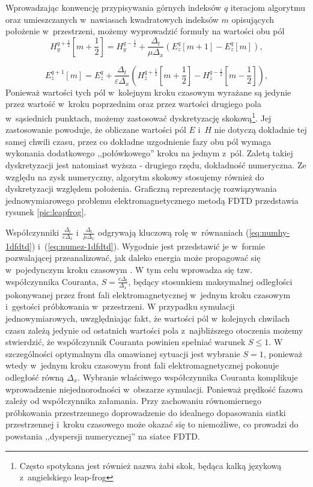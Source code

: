  Wprowadzając konwencję przypisywania górnych indeksów $q$  iteracjom algorytmu oraz umieszczanych w~nawiasach kwadratowych indeksów $m$ opisujących położenie w~przestrzeni, możemy wyprowadzić formuły na wartości obu pól
\begin{equation}
H_y^{q+\frac{1}{2}}[m+\frac{1}{2}]=H_y^{q-\frac{1}{2}}+\frac{\Delta_t}{\mu \Delta_x}(E^q_z[m+1]-E^q_z[m]),
\label{eq:numhy-1dfdtd}
\end{equation}

\begin{equation}
E_z^{q+1}[m]=E_z^{q}+\frac{\Delta_t}{\varepsilon \Delta_x}(H^{q+\frac{1}{2}}_z[m+\frac{1}{2}]-H^{q-\frac{1}{2}}_z[m-\frac{1}{2}]),
\label{eq:numez-1dfdtd}
\end{equation}
 Ponieważ wartości tych pól w~kolejnym kroku czasowym wyrażane są jedynie przez wartość w~kroku poprzednim oraz przez wartości drugiego pola w~sąsiednich punktach, możemy zastosować dyskretyzację skokową\footnote{Często spotykana jest również nazwa żabi skok, będąca kalką językową z~angielskiego leap-frog}. Jej zastosowanie powoduje, że obliczane wartości pól $E$ i~$H$ nie dotyczą dokładnie tej samej chwili czasu, przez co dokładne uzgodnienie fazy obu pól wymaga wykonania dodatkowego ,,połówkowego'' kroku na jednym z~pól. Zaletą takiej dyskretyzacji jest natomiast wyższa - drugiego rzędu, dokładność numeryczna. Ze względu na zysk numeryczny, algorytm skokowy stosujemy również do dyskretyzacji względem położenia. Graficzną reprezentację rozwiązywania jednowymiarowego problemu elektromagnetycznego metodą FDTD przedstawia rysunek \ref{pic:leapfrog}.

Współczynniki $\frac{\Delta_t}{\varepsilon \Delta_x}$ i~$\frac{\Delta_t}{\mu \Delta_x}$ odgrywają kluczową rolę w~równaniach (\ref{eq:numhy-1dfdtd}) i~(\ref{eq:numez-1dfdtd}). Wygodnie jest przedstawić je w~formie pozwalającej przeanalizować, jak daleko energia może propagować się w~pojedynczym kroku czasowym \cite{understanding-fdtd}. W tym celu wprowadza się tzw. współczynnika Couranta, $S=\frac{c \Delta_t}{\Delta_x}$, będący stosunkiem maksymalnej odległości pokonywanej przez front fali elektromagnetycznej w~jednym kroku czasowym i~gęstości próbkowania w~przestrzeni. W przypadku symulacji jednowymiarowych, uwzględniając fakt, że wartości pól w~kolejnych chwilach czasu zależą jedynie od ostatnich wartości pola z~najbliższego otoczenia możemy stwierdzić, że współczynnik Couranta powinien spełniać warunek $S\le1$. W szczególności optymalnym dla omawianej sytuacji jest wybranie $S=1$, ponieważ wtedy w~jednym kroku czasowym front fali elektromagnetycznej pokonuje odległość równą $\Delta_x$. Wybranie właściwego współczynnika Couranta komplikuje wprowadzenie niejednorodności w~obszarze symulacji. Ponieważ prędkość fazowa zależy od współczynnika załamania. Przy zachowaniu równomiernego próbkowania przestrzennego doprowadzenie do idealnego dopasowania siatki przestrzennej i~kroku czasowego może okazać się to niemożliwe, co prowadzi do powstania ,,dyspersji numerycznej'' na siatce FDTD. 

